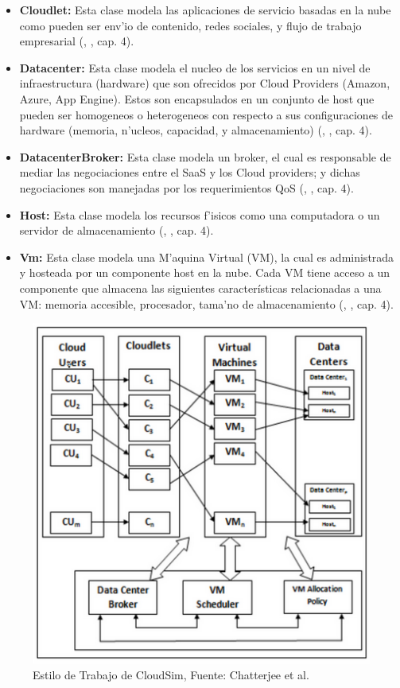 \begin{itemize}
	\item  \textbf{Cloudlet:} Esta clase modela las aplicaciones de servicio basadas en la nube como pueden ser env'io de contenido, redes sociales, y flujo de trabajo empresarial (\citeauthor{calheiros2011cloudsim}, \citeyear{calheiros2011cloudsim}, cap. 4).
	\item  \textbf{Datacenter:} Esta clase modela el nucleo de los servicios en un nivel de infraestructura (hardware) que son ofrecidos por Cloud Providers (Amazon, Azure, App Engine). Estos son encapsulados en un conjunto de host que pueden ser homogeneos o heterogeneos con respecto a sus configuraciones de hardware (memoria, n'ucleos, capacidad, y almacenamiento) (\citeauthor{calheiros2011cloudsim}, \citeyear{calheiros2011cloudsim}, cap. 4).
	\item  \textbf{DatacenterBroker:} Esta clase modela un broker, el cual es responsable de mediar las negociaciones entre el SaaS y los Cloud providers; y dichas negociaciones son manejadas por los requerimientos QoS (\citeauthor{calheiros2011cloudsim}, \citeyear{calheiros2011cloudsim}, cap. 4).
	\item  \textbf{Host:} Esta clase modela los recursos f'isicos como una computadora o un servidor de almacenamiento (\citeauthor{calheiros2011cloudsim}, \citeyear{calheiros2011cloudsim}, cap. 4).
	\item  \textbf{Vm:} Esta clase modela una M'aquina Virtual (VM), la cual es administrada y hosteada por un componente host en la nube. Cada VM tiene acceso a un componente que almacena las siguientes características relacionadas a una VM: memoria accesible, procesador, tama'no de almacenamiento (\citeauthor{calheiros2011cloudsim}, \citeyear{calheiros2011cloudsim}, cap. 4).
\end{itemize}



\begin{figure}
	\caption{Estilo de Trabajo de CloudSim, Fuente: Chatterjee et al.}
	\centering
	\includegraphics[scale=0.5]{media/imagenuno}
\end{figure}


